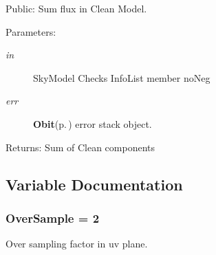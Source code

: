 Public: Sum flux in Clean Model. 

\begin{Desc}
\item[Parameters:]
\begin{description}
\item[{\em in}]Sky\-Model Checks Info\-List member no\-Neg \item[{\em err}]{\bf Obit}{\rm (p.\,\pageref{structObit})} error stack object. \end{description}
\end{Desc}
\begin{Desc}
\item[Returns:]Sum of Clean components \end{Desc}


\subsection{Variable Documentation}
\subsubsection{ {\bf Over\-Sample} = 2}\label{ObitSkyModel_8c_a5}


Over sampling factor in uv plane. 

